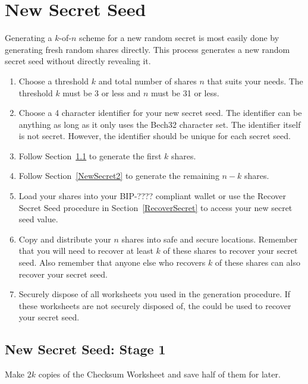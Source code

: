 \documentclass{article}
\newenvironment{enumeratenumeric}{\begin{enumerate}[1.] }{\end{enumerate}}
\begin{document}
\section{New Secret Seed}

Generating a $k$-of-$n$ scheme for a new random secret is most easily done by
generating fresh random shares directly. This process generates a new random
secret seed without directly revealing it.
\begin{enumeratenumeric}
  \item Choose a threshold $k$ and total number of shares $n$ that suits your
  needs. The threshold $k$ must be 3 or less and $n$ must be 31 or less.
  
  \item Choose a 4 character identifier for your new secret seed. The
  identifier can be anything as long as it only uses the Bech32 character set.
  The identifier itself is not secret. However, the identifier should be
  unique for each secret seed.
  
  \item Follow Section~\ref{NewSecret1} to generate the first $k$ shares.
  
  \item Follow Section~\ref{NewSecret2} to generate the remaining $n - k$
  shares.
  
  \item Load your shares into your BIP-???? compliant wallet or use the
  Recover Secret Seed procedure in Section~\ref{RecoverSecret} to access your
  new secret seed value.
  
  \item Copy and distribute your $n$ shares into safe and secure locations.
  Remember that you will need to recover at least $k$ of these shares to
  recover your secret seed. Also remember that anyone else who recovers $k$ of
  these shares can also recover your secret seed.
  
  \item Securely dispose of all worksheets you used in the generation
  procedure. If these worksheets are not securely disposed of, the could be
  used to recover your secret seed.
\end{enumeratenumeric}
\subsection{New Secret Seed: Stage 1}\label{NewSecret1}

Make $2 k$ copies of the Checksum Worksheet and save half of them for later.
\end{document}
